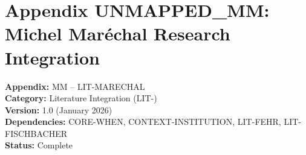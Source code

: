 
\chapter*{Appendix UNMAPPED_MM: Michel Maréchal Research Integration}
\label{app:marechal}

\begin{tcolorbox}[colback=white,colframe=black!75!white,title=Appendix Metadata]
\textbf{Appendix:} MM -- LIT-MARECHAL \\
\textbf{Category:} Literature Integration (LIT-) \\
\textbf{Version:} 1.0 (January 2026) \\
\textbf{Dependencies:} CORE-WHEN, CONTEXT-INSTITUTION, LIT-FEHR, LIT-FISCHBACHER \\
\textbf{Status:} Complete
\end{tcolorbox}

